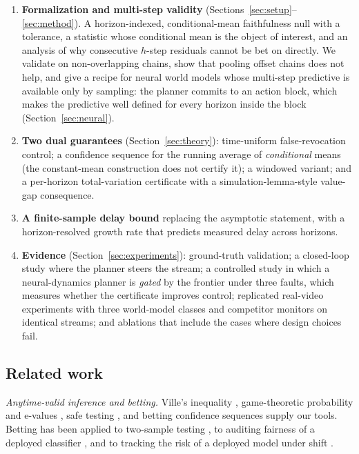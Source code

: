\begin{enumerate}[leftmargin=1.4em,itemsep=2pt]
\item \textbf{Formalization and multi-step validity} (Sections~\ref{sec:setup}--\ref{sec:method}).
A horizon-indexed, conditional-mean faithfulness null with a tolerance, a statistic whose
conditional mean is the object of interest, and an analysis of why consecutive $h$-step residuals
cannot be bet on directly. We validate on non-overlapping chains, show that pooling offset chains does not help, and
give a recipe for neural world models whose multi-step predictive is available only by sampling: the planner commits to an
action block, which makes the predictive well defined for every horizon inside the block (Section~\ref{sec:neural}).
\item \textbf{Two dual guarantees} (Section~\ref{sec:theory}): time-uniform false-revocation control;
a confidence sequence for the running average of \emph{conditional} means (the constant-mean
construction does not certify it); a windowed variant; and a per-horizon total-variation
certificate with a simulation-lemma-style value-gap consequence.
\item \textbf{A finite-sample delay bound} replacing the asymptotic statement, with a
horizon-resolved growth rate that predicts measured delay across horizons.
\item \textbf{Evidence} (Section~\ref{sec:experiments}): ground-truth validation; a closed-loop study where the
planner steers the stream; a controlled study in which a neural-dynamics planner is \emph{gated} by the frontier under
three faults, which measures whether the certificate improves control; replicated real-video experiments with three
world-model classes and competitor monitors on identical streams; and ablations that include the cases where design
choices fail.
\end{enumerate}

\subsection{Related work}\label{sec:related}

\emph{Anytime-valid inference and betting.} Ville's inequality \citep{ville1939}, game-theoretic
probability and e-values \citep{shafer2019game,vovk2021evalues,ramdas2023savi}, safe testing
\citep{gruenwald2024safe}, and betting confidence sequences \citep{waudbysmith2024betting,
howard2021timeuniform} supply our tools. Betting has been applied to two-sample testing
\citep{shekhar2023nonparametric}, to auditing fairness of a deployed classifier
\citep{chugg2023auditing}, and to tracking the risk of a deployed model under shift
\citep{podkopaev2022tracking}.

